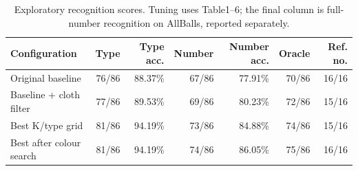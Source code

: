 \begin{table}[htbp]
\centering
\small
\caption{Exploratory recognition scores. Tuning uses Table1--6; the final column is full-number recognition on AllBalls, reported separately.}
\label{tab:recognition-search-summary}
\begin{tabular}{lrrrrrr}
\toprule
Configuration & Type & Type acc. & Number & Number acc. & Oracle & Ref. no. \\
\midrule
Original baseline & 76/86 & 88.37\% & 67/86 & 77.91\% & 70/86 & 16/16 \\
Baseline + cloth filter & 77/86 & 89.53\% & 69/86 & 80.23\% & 72/86 & 15/16 \\
Best K/type grid & 81/86 & 94.19\% & 73/86 & 84.88\% & 74/86 & 15/16 \\
Best after colour search & 81/86 & 94.19\% & 74/86 & 86.05\% & 75/86 & 16/16 \\
\bottomrule
\end{tabular}
\end{table}
\FloatBarrier
